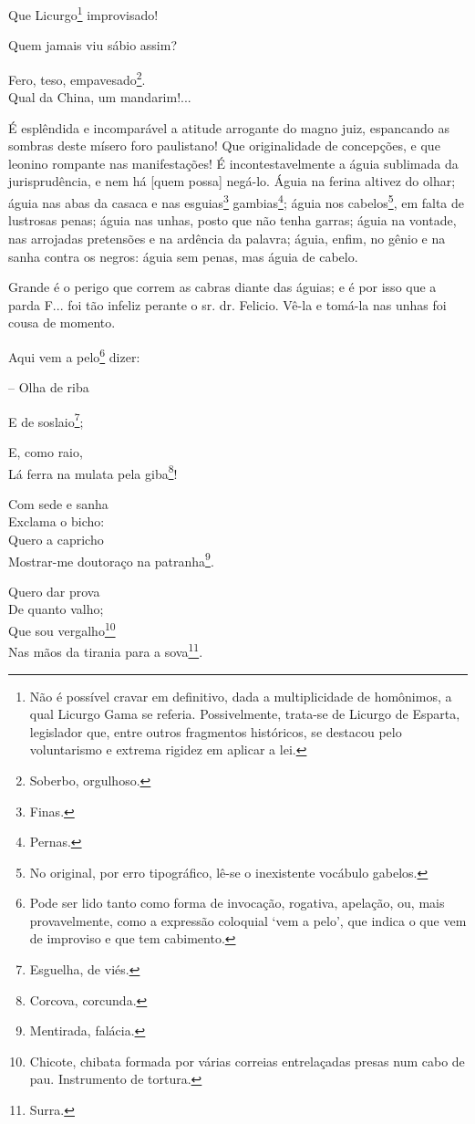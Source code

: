 Que Licurgo\footnote{ Não é possível cravar em definitivo, dada a
  multiplicidade de homônimos, a qual Licurgo Gama se referia.
  Possivelmente, trata-se de Licurgo de Esparta, legislador que, entre
  outros fragmentos históricos, se destacou pelo voluntarismo e extrema
  rigidez em aplicar a lei.} improvisado!

Quem jamais viu sábio assim?

Fero, teso, empavesado\footnote{ Soberbo, orgulhoso.}.\\
Qual da China, um mandarim!...

É esplêndida e incomparável a atitude arrogante do magno juiz,
espancando as sombras deste mísero foro paulistano! Que originalidade de
concepções, e que leonino rompante nas manifestações! É
incontestavelmente a águia sublimada da jurisprudência, e nem há {[}quem
possa{]} negá-lo. Águia na ferina altivez do olhar; águia nas abas da
casaca e nas esguias\footnote{ Finas.} gambias\footnote{ Pernas.};
águia nos cabelos\footnote{ No original, por erro tipográfico, lê-se o
  inexistente vocábulo gabelos.}, em falta de lustrosas penas; águia nas
unhas, posto que não tenha garras; águia na vontade, nas arrojadas
pretensões e na ardência da palavra; águia, enfim, no gênio e na sanha
contra os negros: águia sem penas, mas águia de cabelo.

Grande é o perigo que correm as cabras diante das águias; e é por isso
que a parda F... foi tão infeliz perante o sr. dr. Felicio. Vê-la e
tomá-la nas unhas foi cousa de momento.

Aqui vem a pelo\footnote{ Pode ser lido tanto como forma de invocação,
  rogativa, apelação, ou, mais provavelmente, como a expressão coloquial
  `vem a pelo', que indica o que vem de improviso e que tem cabimento.}
dizer:

-- Olha de riba

E de soslaio\footnote{ Esguelha, de viés.};

E, como raio,\\
Lá ferra na mulata pela giba\footnote{ Corcova, corcunda.}!

Com sede e sanha\\
Exclama o bicho:\\
Quero a capricho\\
Mostrar-me doutoraço na patranha\footnote{ Mentirada, falácia.}.

Quero dar prova\\
De quanto valho;\\
Que sou vergalho\footnote{ Chicote, chibata formada por várias correias
  entrelaçadas presas num cabo de pau. Instrumento de tortura.}\\
Nas mãos da tirania para a sova\footnote{ Surra.}.

